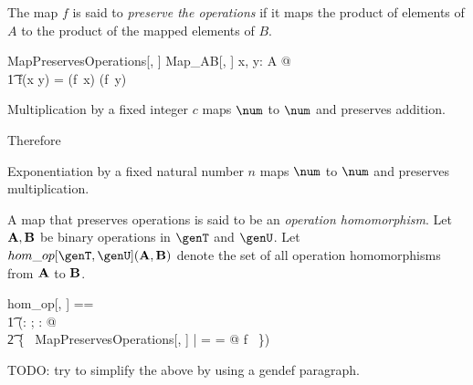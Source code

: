 \documentclass{amsart}
\begin{document}
The map $f$ is said to {\em preserve the operations} if it maps the product of elements of $A$ to 
the product of the mapped elements of $B$.
\begin{schema}{MapPreservesOperations}[\genT, \genU]
	Map\_AB[\genT, \genU]
\where
	\forall x, y: A @ \\
	\t1	f(x \mulA y) = (f~x) \mulB (f~y)
\end{schema}

\begin{example}
Multiplication by a fixed integer $c$ maps $\num$ to $\num$ and preserves addition.

Therefore
\end{example}

\begin{example}
Exponentiation by a fixed natural number $n$ maps $\num$ to $\num$ and preserves multiplication.
\end{example}

A map that preserves operations is said to be an \textit{operation homomorphism}.
Let $\mathbf{A}, \mathbf{B}$ be binary operations in $\genT$ and $\genU$. 
Let $hom\_op[\genT, \genU](\strucA, \strucB)$ denote the set of all operation homomorphisms from $\mathbf{A}$ to $\mathbf{B}$.

\begin{zed}
	hom\_op[\genT, \genU] == \\
	\t1	(\lambda \alpha: \binop \genT; \beta: \binop \genU @ \\
	\t2		\{~ MapPreservesOperations[\genT, \genU] | \alpha = \strucA \land \beta = \strucB @ f ~\})
\end{zed}

TODO: try to simplify the above by using a gendef paragraph.
\end{document}
